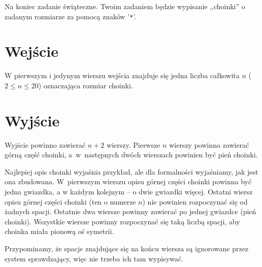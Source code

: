 \documentclass{spiral-kurs}
\begin{document}
\makeheader
%
  Na koniec zadanie świąteczne.
  Twoim zadaniem będzie wypisanie ,,choinki'' o zadanym rozmiarze za pomocą znaków '\texttt{*}'.

  \section{Wejście}
  W pierwszym i jedynym wierszu wejścia znajduje się
  jedna liczba całkowita $n$ ($2 \le n \le 20$) oznaczająca rozmiar choinki.

  \section{Wyjście}
  Wyjście powinno zawierać $n + 2$ wierszy.
  Pierwsze $n$ wierszy powinno zawierać górną część choinki,
  a~w~następnych dwóch wierszach powinien być pień choinki.

  Najlepiej opis choinki wyjaśnia przykład, ale dla formalności wyjaśniamy, jak
  jest ona zbudowana.
  W~pierwszym wierszu opisu górnej części choinki powinna być jedna gwiazdka,
  a w każdym kolejnym -- o dwie gwiazdki więcej.
  Ostatni wiersz opisu górnej części choinki (ten o numerze $n$) nie powinien rozpoczynać
  się od żadnych spacji.
  Ostatnie dwa wiersze powinny zawierać po jednej gwiazdce (pień choinki).
  Wszystkie wiersze powinny rozpoczynać się taką liczbą spacji, aby choinka
  miała pionową oś symetrii.

  Przypominamy, że spacje znajdujące się na końcu wiersza są ignorowane
  przez system sprawdzający, więc nie trzeba ich tam wypisywać.




  
\end{document}

